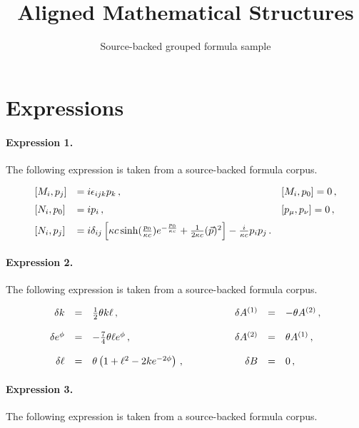\documentclass[11pt]{article}
\title{Aligned Mathematical Structures}
\author{Source-backed grouped formula sample}
\date{}
\begin{document}
\maketitle
\section{Expressions}
\paragraph{Expression 1.} The following expression is taken from a source-backed formula corpus.

\begin{align*}\begin{array}{lll}[ M_i , p_j ] & = i\epsilon_{ijk}p_k\, ,\qquad & [ M_i , p_0 ] =0\, ,\medskip\cr [ N_i , p_0 ] & = i p_i\, , \qquad & [ p_\mu ,p_\nu ] = 0\, ,\medskip\cr[ N_i , p_j ]& =i\delta_{ij}\left[\kappa c\sinh(\frac {p_0}{\kappa c})e^{-\frac{p_0}{\kappa c}} + \frac1{2\kappa c} (\vec p)^2\right] -\frac {i}{\kappa c} p_i p_j\,.&\end{array}\end{align*}

\paragraph{Expression 2.} The following expression is taken from a source-backed formula corpus.

\begin{align*}\begin{array}{rclrcl}\delta k & = & \frac{1}{2} \theta k\ell\, ,\hspace{1cm}&\delta A^{(1)}&=&-\theta A^{(2)}\, ,\\& & & & & \\\delta e^{\phi}&=&-\frac{7}{4}\theta \ell e^{\phi}\, ,&\delta A^{(2)} & = & \theta A^{(1)}\, ,\\& & & & & \\\delta \ell&=&\theta \left( 1 +\ell^{2} -2k e^{-2\phi}\right)\, ,\hspace{1.5cm}&\delta B&=&0\, ,\\\end{array}\end{align*}

\paragraph{Expression 3.} The following expression is taken from a source-backed formula corpus.
\end{document}
